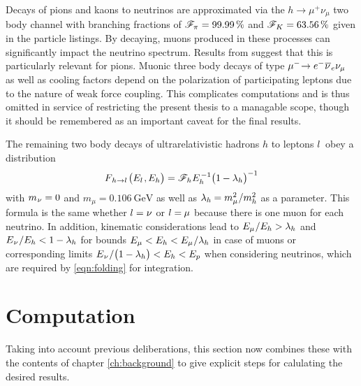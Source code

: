Decays of pions and kaons to neutrinos are approximated via the $h \rightarrow \mu^+ \nu_\mu$ two body channel with branching
fractions of $\mathscr{F}_{\kern-0.2pt \pi \kern+0.2pt} = \qty{99.99}{\percent}$ and
$\mathscr{F}_{\kern+0.3pt K \kern+0.2pt} = \qty{63.56}{\percent}$ given in the \cite{pdg}
particle listings. By decaying, muons produced in these processes can significantly impact the neutrino spectrum. Results from
\cite{Carpio_2020} suggest that this is particularly relevant for pions. Muonic three body decays of type
$\mu^- \kern-2.5pt \kern+0.5pt \rightarrow e^- \kern+0.5pt \overline{\kern-0.2pt \nu \kern+0.8pt}_e \nu_\mu$ as well as
cooling factors depend on the polarization of participating leptons due to the nature of weak force coupling. This complicates
computations and is thus omitted in service of restricting the present thesis to a managable scope, though it should be remembered
as an important caveat for the final results.

The remaining two body decays of ultrarelativistic hadrons $h$ to leptons $l \kern+1.0pt$ obey a distribution
\begin{equation*}
	F_{\kern+1.0pt h \kern+0.2pt \rightarrow l \kern+1.0pt} \bigl( E_l \kern+0.8pt, \kern-0.2pt E_h \bigr) =
	\mathscr{F}_{\kern+0.2pt h \kern+0.2pt} E_h^{\kern+1.0pt -1} \bigl( 1 \kern-0.3pt - \lambda_h \bigr)^{-1}
\end{equation*}
with $m_{\kern+0.5pt \nu} = 0$ and $m_\mu = \qty{0.106}{\giga\electronvolt}$ \cite{pdg} as well as
$\lambda_h \kern-0.3pt = m_\mu^2 \kern+0.5pt / m_h^2$ as a parameter. This formula is the same whether
$l = \nu \kern+0.2pt$ or $l = \kern-0.3pt \mu$ because there is one muon for each neutrino. In addition,
kinematic considerations lead to $E_\mu \kern+0.5pt / E_h > \lambda_h$ and
$E_{\kern+0.5pt \nu} \kern+0.5pt / E_h < 1 - \lambda_h$ for bounds
$E_\mu < E_h < E_\mu \kern+0.5pt / \lambda_h$ in case of muons or corresponding limits
$E_{\kern+0.5pt \nu} \kern+0.5pt / \smash{\bigl( 1 - \lambda_h \bigr)} < E_h < E_p$ when considering neutrinos, which are
required by \eqref{eqn:folding} for integration.



\section{Computation}
\label{sec:computation}

Taking into account previous deliberations, this section now combines these with the contents of chapter \ref{ch:background}
to give explicit steps for calulating the desired results.



